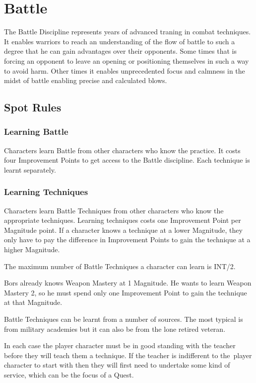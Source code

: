 \chapter{Battle}
\label{ch:battle}

The Battle Discipline represents years of advanced traning in combat techniques. It enables warriors to reach an understanding of the flow of battle to such a degree that he can gain advantages over their opponents. Some times that is forcing an opponent to leave an opening or positioning themselves in such a way to avoid harm. Other times it enables unprecedented focus and calmness in the midst of battle enabling precise and calculated blows.


\section{Spot Rules}

\subsection{Learning Battle}
Characters learn Battle from other characters who know the practice. It costs four Improvement Points to get access to the Battle discipline. Each technique is learnt separately.

\subsection{Learning Techniques}
Characters learn Battle Techniques from other characters who know the appropriate techniques. Learning techniques costs one Improvement Point per Magnitude point. If a character knows a technique at a lower Magnitude, they only have to pay the difference in Improvement Points to gain the technique at a higher Magnitude.

The maximum number of Battle Techniques a character can learn is INT/2.

\begin{rpg-examplebox}
Bors already knows Weapon Mastery at 1 Magnitude. He wants to learn Weapon Mastery 2, so he must spend only one Improvement Point to gain the technique at that Magnitude.
\end{rpg-examplebox}

Battle Techniques can be learnt from a number of sources. The most typical is from military academies but it can also be from the lone retired veteran. 

In each case the player character must be in good standing with the teacher before they will teach them a technique. If the teacher is indifferent to the player character to start with then they will first need to undertake some kind of service, which can be the focus of a Quest.

